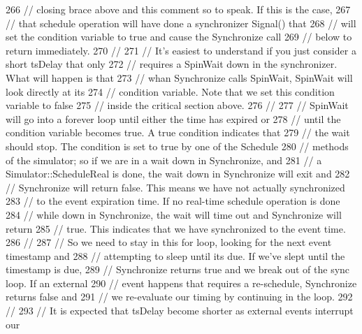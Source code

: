 \begin{DoxyCode}
266       \textcolor{comment}{// closing brace above and this comment so to speak.  If this is the case, }
267       \textcolor{comment}{// that schedule operation will have done a synchronizer Signal() that }
268       \textcolor{comment}{// will set the condition variable to true and cause the Synchronize call }
269       \textcolor{comment}{// below to return immediately.}
270       \textcolor{comment}{//}
271       \textcolor{comment}{// It's easiest to understand if you just consider a short tsDelay that only}
272       \textcolor{comment}{// requires a SpinWait down in the synchronizer.  What will happen is that }
273       \textcolor{comment}{// whan Synchronize calls SpinWait, SpinWait will look directly at its }
274       \textcolor{comment}{// condition variable.  Note that we set this condition variable to false }
275       \textcolor{comment}{// inside the critical section above. }
276       \textcolor{comment}{//}
277       \textcolor{comment}{// SpinWait will go into a forever loop until either the time has expired or}
278       \textcolor{comment}{// until the condition variable becomes true.  A true condition indicates that}
279       \textcolor{comment}{// the wait should stop.  The condition is set to true by one of the Schedule}
280       \textcolor{comment}{// methods of the simulator; so if we are in a wait down in Synchronize, and}
281       \textcolor{comment}{// a Simulator::ScheduleReal is done, the wait down in Synchronize will exit and}
282       \textcolor{comment}{// Synchronize will return false.  This means we have not actually synchronized}
283       \textcolor{comment}{// to the event expiration time.  If no real-time schedule operation is done}
284       \textcolor{comment}{// while down in Synchronize, the wait will time out and Synchronize will return }
285       \textcolor{comment}{// true.  This indicates that we have synchronized to the event time.}
286       \textcolor{comment}{//}
287       \textcolor{comment}{// So we need to stay in this for loop, looking for the next event timestamp and }
288       \textcolor{comment}{// attempting to sleep until its due.  If we've slept until the timestamp is due, }
289       \textcolor{comment}{// Synchronize returns true and we break out of the sync loop.  If an external}
290       \textcolor{comment}{// event happens that requires a re-schedule, Synchronize returns false and}
291       \textcolor{comment}{// we re-evaluate our timing by continuing in the loop.}
292       \textcolor{comment}{//}
293       \textcolor{comment}{// It is expected that tsDelay become shorter as external events interrupt our}

\end{DoxyCode}
